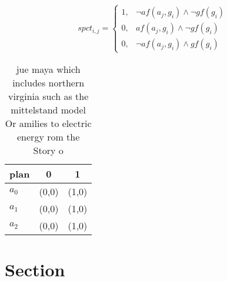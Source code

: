 \documentclass[a4paper]{article}
\begin{document}
\begin{equation}
spct_{i,j} =
\begin{cases}
1, & \text{$\neg af(a_j,g_i) \wedge \neg gf(g_i)$}\\
0, & \text{$af(a_j,g_i) \wedge \neg gf(g_i)$}\\
0, & \text{$\neg af(a_j,g_i) \wedge gf(g_i)$}
\end{cases}
\end{equation}

\begin{table}
\begin{adjustbox}{width=0.5\columnwidth}
\begin{tabular}{|l|l|l|}
\hline
\textbf{plan} & \multicolumn{1}{c|}{\textbf{0}} & \multicolumn{1}{c|}{\textbf{1}} \\ \hline
\textbf{$a_0$}  & (0,0) & (1,0) \\ \hline
\textbf{$a_1$}  & (0,0) & (1,0) \\ \hline
\textbf{$a_2$}  & (0,0) & (1,0) \\ \hline
\end{tabular}
\end{adjustbox}
\caption{ jue maya which includes northern virginia such as the mittelstand model Or amilies to electric energy rom the Story o 
}
\end{table}

\section{Section}
\end{document}

